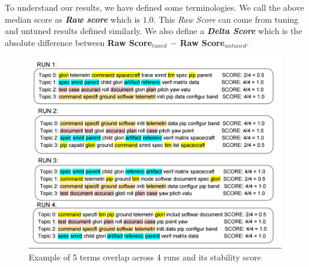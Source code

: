 \documentclass[conference]{IEEEtran}
\theoremstyle{break}
\begin{document}
To understand our results, we have defined some terminologies. We call the above median score as \textbf{\textit{Raw score}} which is $1.0$. This \textit{Raw Score} can come from tuning and untuned results defined similarly. We also define a \textbf{\textit{Delta Score}} which is the absolute difference between \textbf{Raw Score$_{tuned}$ $-$ Raw Score$_{untuned}$}.

\begin{figure}[!htpb]
  \captionsetup{justification=centering}
  \includegraphics[width=\linewidth]{./fig/jaccard.png}
  \caption{Example of 5 terms overlap across 4 runs and its stability score}
  \label{fig: jaccard}
\end{figure}
\end{document}
